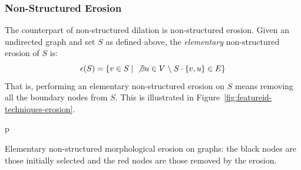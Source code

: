 \subsubsection{Non-Structured Erosion}

The counterpart of non-structured dilation is non-structured erosion. Given an undirected graph and set $S$ as defined above, the \emph{elementary} non-structured erosion of $S$ is:
%
\[
\epsilon(S) = \{v \in S \; | \; \not\exists u \in V \; \backslash \; S \cdot \{v,u\} \in E\}
\]
%
That is, performing an elementary non-structured erosion on $S$ means removing all the boundary nodes from $S$. This is illustrated in Figure~\ref{fig:featureid-techniques-erosion}.

\begin{stusubfig}{p}
	\hspace{4mm}%
\caption{Elementary non-structured morphological erosion on graphs: the black nodes are those initially selected and the red nodes are those removed by the erosion.}
\label{fig:featureid-techniques-erosion}
\end{stusubfig}

